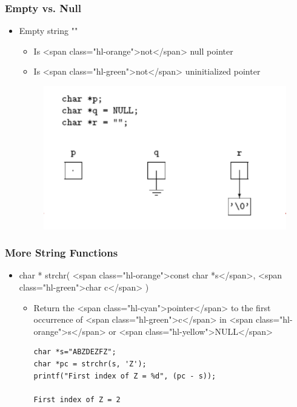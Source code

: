 \documentclass{../c-lecture}
\begin{document}
\begin{frame}
  \frametitle{Empty vs. Null}
  \begin{itemize}
    \item Empty string ""
    \begin{itemize}
      \item Is <span class="hl-orange">not</span> null pointer
      \item Is <span class="hl-green">not</span> uninitialized pointer
    \end{itemize}
    \begin{figure}
      \includegraphics[height=.75\textheight]{img/null-empty-string.png}
    \end{figure}
  \end{itemize}
\end{frame}

\begin{frame}[fragile]
  \frametitle{More String Functions}
  \begin{itemize}
    \item
      char * strchr( <span class="hl-orange">const char *s</span>,
      <span class="hl-green">char c</span>
      )
    \begin{itemize}
      \item
        Return the <span class="hl-cyan">pointer</span> to the first
        occurrence of <span class="hl-green">c</span> in
        <span class="hl-orange">s</span> or
        <span class="hl-yellow">NULL</span>

      \begin{verbatim}
char *s="ABZDEZFZ";
char *pc = strchr(s, 'Z');
printf("First index of Z = %d", (pc - s));

First index of Z = 2
      \end{verbatim}
    \end{itemize}
  \end{itemize}
\end{frame}
\end{document}
